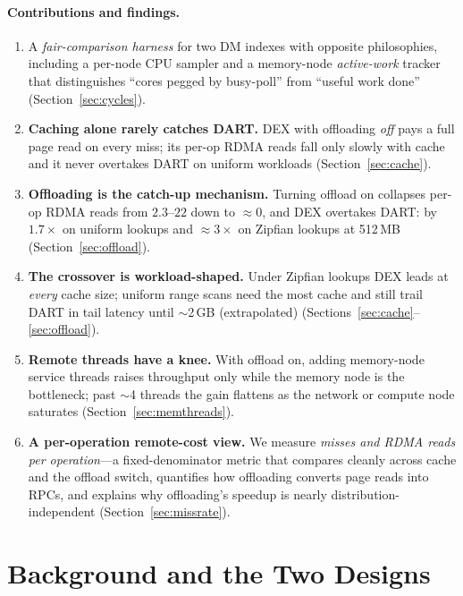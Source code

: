 \documentclass[sigconf,nonacm]{acmart}
\begin{document}
\paragraph{Contributions and findings.}
\begin{enumerate}
  \item A \emph{fair-comparison harness} for two DM indexes with opposite
        philosophies, including a per-node CPU sampler and a memory-node
        \emph{active-work} tracker that distinguishes ``cores pegged by
        busy-poll'' from ``useful work done'' (Section~\ref{sec:cycles}).
  \item \textbf{Caching alone rarely catches DART.} DEX with offloading
        \emph{off} pays a full page read on every miss; its per-op RDMA reads
        fall only slowly with cache and it never overtakes DART on uniform
        workloads (Section~\ref{sec:cache}).
  \item \textbf{Offloading is the catch-up mechanism.} Turning offload on
        collapses per-op RDMA reads from $2.3$--$22$ down to $\approx0$, and DEX
        overtakes DART: by $1.7\times$ on uniform lookups and $\approx3\times$
        on Zipfian lookups at 512\,MB (Section~\ref{sec:offload}).
  \item \textbf{The crossover is workload-shaped.} Under Zipfian lookups DEX
        leads at \emph{every} cache size; uniform range scans need the most
        cache and still trail DART in tail latency until $\sim$2\,GB
        (extrapolated) (Sections~\ref{sec:cache}--\ref{sec:offload}).
  \item \textbf{Remote threads have a knee.} With offload on, adding
        memory-node service threads raises throughput only while the memory node
        is the bottleneck; past $\sim$4 threads the gain flattens as the network
        or compute node saturates (Section~\ref{sec:memthreads}).
  \item \textbf{A per-operation remote-cost view.} We measure \emph{misses and
        RDMA reads per operation}---a fixed-denominator metric that compares
        cleanly across cache and the offload switch, quantifies how offloading
        converts page reads into RPCs, and explains why offloading's speedup is
        nearly distribution-independent (Section~\ref{sec:missrate}).
\end{enumerate}

\section{Background and the Two Designs}
\label{sec:bg}
\end{document}
